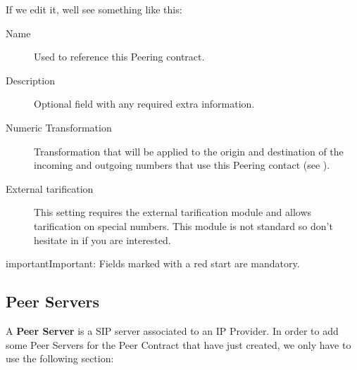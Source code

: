 \documentclass[letterpaper,10pt,english]{sphinxmanual}
\begin{document}

If we edit it, well see something like this:

\begin{description}
\item[{Name}] \leavevmode{}\label{external_incoming_calls/peering_contracts:term-name}
Used to reference this Peering contract.

\item[{Description}] \leavevmode{}\label{external_incoming_calls/peering_contracts:term-description}
Optional field with any required extra information.

\item[{Numeric Transformation}] \leavevmode{}\label{external_incoming_calls/peering_contracts:term-numeric-transformation}
Transformation that will be applied to the origin and destination of the
incoming and outgoing numbers that use this Peering contact
(see {\hyperref[external_incoming_calls/numeric_transformations:numeric\string-transformations]{}}).

\item[{External tarification}] \leavevmode{}\label{external_incoming_calls/peering_contracts:term-external-tarification}
This setting requires the external tarification module and allows
tarification on special numbers. This module is not standard so don't
hesitate in {\hyperref[intro/getting_help:getting\string-help]{}} if you are interested.

\end{description}

\begin{notice}{important}{Important:}
Fields marked with a red start are mandatory.
\end{notice}


\subsection{Peer Servers}
\label{external_incoming_calls/peering_contracts:peer-servers}
A \textbf{Peer Server} is a SIP server associated to an IP Provider.
In order to add some Peer Servers for the Peer Contract that
have just created, we only have to use the following section:
\end{document}
